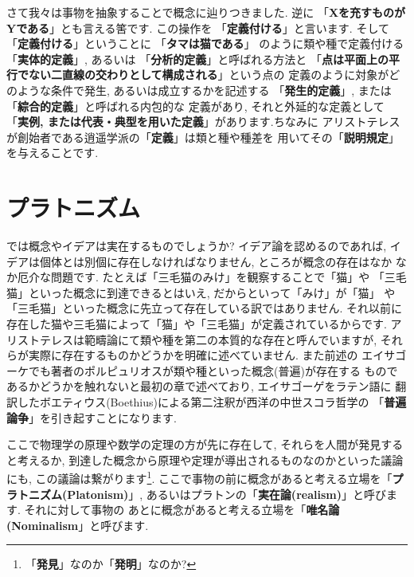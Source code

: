 さて我々は事物を抽象することで概念に辿りつきました. 逆に
「\textbf{Xを充すものがYである}」とも言える筈です. この操作を
「\textbf{定義付ける}」と言います. そして「\textbf{定義付ける}」ということに
「\textbf{タマは猫である}」 のように類や種で定義付ける「\textbf{実体的定義}」,
 あるいは 「\textbf{分析的定義}」と呼ばれる方法と
「\textbf{点は平面上の平行でない二直線の交わりとして構成される}」という点の
定義のように対象がどのような条件で発生, あるいは成立するかを記述する
「\textbf{発生的定義}」, または 「\textbf{綜合的定義}」と呼ばれる内包的な
定義があり, それと外延的な定義として
「\textbf{実例, または代表・典型を用いた定義}」があります.ちなみに
アリストテレスが創始者である逍遥学派の「\textbf{定義}」は類と種や種差を
用いてその「\textbf{説明規定}」を与えることです.


\section{プラトニズム}


では概念やイデアは実在するものでしょうか? イデア論を認めるのであれば,
 イデアは個体とは別個に存在しなければなりません, ところが概念の存在はなか
なか厄介な問題です. たとえば「三毛猫のみけ」を観察することで「猫」や
「三毛猫」といった概念に到達できるとはいえ, だからといって「みけ」が「猫」
や「三毛猫」といった概念に先立って存在している訳ではありません. それ以前に
存在した猫や三毛猫によって「猫」や「三毛猫」が定義されているからです.
 アリストテレスは範疇論にて類や種を第二の本質的な存在と呼んでいますが,
 それらが実際に存在するものかどうかを明確に述べていません. また前述の
エイサゴーケでも著者のポルピュリオスが類や種といった概念(普遍)が存在する
ものであるかどうかを触れないと最初の章で述べており, エイサゴーゲをラテン語に
翻訳したボエティウス(Boethius)による第二注釈が西洋の中世スコラ哲学の
「\textbf{普遍論争}」を引き起すことになります\cite{普遍論争}.
\newline


ここで物理学の原理や数学の定理の方が先に存在して, それらを人間が発見する
と考えるか, 到達した概念から原理や定理が導出されるものなのかといった議論にも,
 この議論は繋がります\footnote{「\textbf{発見}」なのか「\textbf{発明}」なのか?}.
 ここで事物の前に概念があると考える立場を「\textbf{プラトニズム(Platonism)}」,
 あるいはプラトンの「\textbf{実在論(realism)}」と呼びます. それに対して事物の
あとに概念があると考える立場を「\textbf{唯名論(Nominalism}」と呼びます.
\newline


